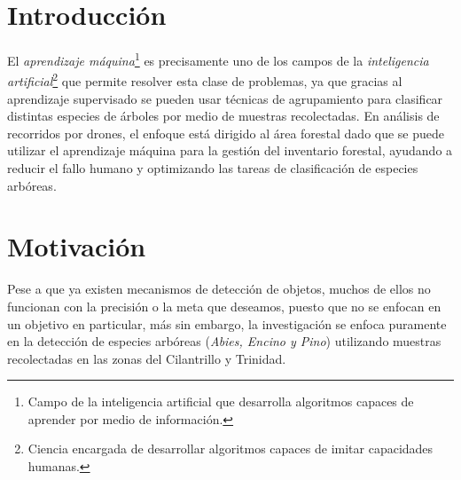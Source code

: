 \documentclass[a0,portrait]{a0poster}
\begin{document}
\begin{multicols}{2} %


\color{Black} %

\section*{Introducción}
El \emph{aprendizaje máquina}\footnote{Campo de la inteligencia artificial que desarrolla algoritmos capaces de aprender por medio de información.} es precisamente uno de los campos de la \emph{inteligencia artificial}\footnote{Ciencia encargada de desarrollar algoritmos capaces de imitar capacidades humanas.} que permite resolver esta clase de problemas, ya que gracias al aprendizaje supervisado se pueden usar técnicas de agrupamiento para clasificar distintas especies de árboles por medio de muestras recolectadas. En análisis de recorridos por drones, el enfoque está dirigido al área forestal dado que se puede utilizar el aprendizaje máquina para la gestión del inventario forestal, ayudando a reducir el fallo humano y optimizando las tareas de clasificación de especies arbóreas.


\section*{Motivación}
Pese a que ya existen mecanismos de detección de objetos, muchos de ellos no funcionan con la precisión o la meta que deseamos, puesto que no se enfocan en un objetivo en particular, más sin embargo, la investigación se enfoca puramente en la detección de especies arbóreas (\emph{Abies, Encino y Pino}) utilizando muestras recolectadas en las zonas del Cilantrillo y Trinidad.


\end{multicols}
\end{document}

